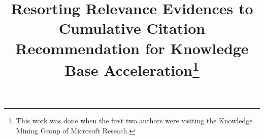 \documentclass{sig-alternate}
\begin{document}
\title{Resorting Relevance Evidences to Cumulative Citation Recommendation for Knowledge Base Acceleration\thanks{This work was done when the first two authors were visiting the Knowledge Mining Group of Microsoft Reseach.}}
%
%
%
%
%
\end{document}
